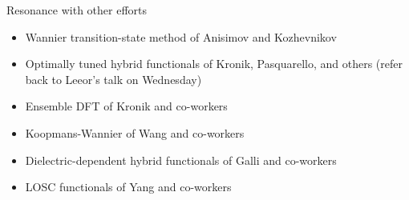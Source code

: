 \documentclass[xcolor=table,aspectratio=169]{beamer}
\numberwithin{equation}{section}
\newcommand{\backupend}{
   \setcounter{framenumber}{\value{finalframe}}
}
\begin{document}
\begin{frame}{Resonance with other efforts}
   \begin{itemize}
      \item Wannier transition-state method of Anisimov and Kozhevnikov \cite{Anisimov2005}
      \item Optimally tuned hybrid functionals of Kronik, Pasquarello, and others (refer back to Leeor's talk on Wednesday) \cite{Kronik2012,Wing2021}
      \item Ensemble DFT of Kronik and co-workers \cite{Kraisler2013}
      \item Koopmans-Wannier of Wang and co-workers \cite{Ma2016}
      \item Dielectric-dependent hybrid functionals of Galli and co-workers \cite{Skone2016a}
      \item LOSC functionals of Yang and co-workers \cite{Li2018}
   \end{itemize}
\end{frame}




\backupend
\end{document}
